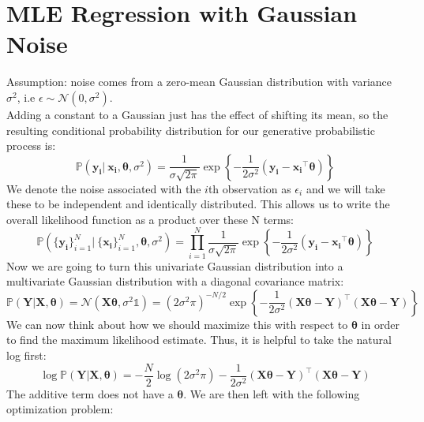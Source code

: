 \documentclass[twoside]{article}
\begin{document}
\section{MLE Regression with Gaussian Noise}
Assumption: noise comes from a zero-mean Gaussian distribution with variance $\sigma^2$, i.e $\epsilon \sim \mathcal{N}(0, \sigma^2)$.\\
Adding a constant to a Gaussian just has the effect of shifting its mean, so the resulting conditional
probability distribution for our generative probabilistic process is:
\begin{equation*}
    \mathbb{P}(\boldsymbol{y_i} | \: \boldsymbol{x_i}, \boldsymbol{\theta}, \sigma^2) = \frac{1}{\sigma\sqrt{2\pi}}\exp{\left \{-\frac{1}{2\sigma^2}(\boldsymbol{y_i} - \boldsymbol{x_i}^{\intercal}\boldsymbol{\theta})\right\}}
\end{equation*}
We denote the noise associated with the $i$th observation as $\epsilon_i$ and we will take these to be independent and identically distributed. This allows us to write the overall likelihood function as a product over these N terms:
\begin{equation*}
    \mathbb{P}(\{\boldsymbol{y_i}\}_{i = 1}^N | \: \{\boldsymbol{x_i}\}_{i = 1}^N, \boldsymbol{\theta}, \sigma^2) = \prod\limits_{i = 1}^N\frac{1}{\sigma\sqrt{2\pi}}\exp{\left \{-\frac{1}{2\sigma^2}(\boldsymbol{y_i} - \boldsymbol{x_i}^{\intercal}\boldsymbol{\theta})\right\}}
\end{equation*}
Now we are going to turn this univariate Gaussian distribution into a multivariate Gaussian distribution with a diagonal covariance matrix:
\begin{equation*}
    \mathbb{P}(\boldsymbol{Y}|\boldsymbol{X},\boldsymbol{\theta}) = \mathcal{N}(\boldsymbol{X}\boldsymbol{\theta}, \sigma^2\mathds{1}) = (2\sigma^2\pi)^{-N / 2}\exp{\left\{ -\frac{1}{2\sigma^2}(\boldsymbol{X\theta} - \boldsymbol{Y})^{\intercal}(\boldsymbol{X\theta} - \boldsymbol{Y}) \right\}}
\end{equation*}
We can now think about how we should maximize this with respect to $\boldsymbol{\theta}$ in order to find the maximum
likelihood estimate. Thus, it is helpful to take the natural log first:
\begin{equation*}
    \log\mathbb{P}(\boldsymbol{Y}|\boldsymbol{X},\boldsymbol{\theta}) = -\frac{N}{2}\log(2\sigma^2\pi) -\frac{1}{2\sigma^2}(\boldsymbol{X\theta} - \boldsymbol{Y})^{\intercal}(\boldsymbol{X\theta} - \boldsymbol{Y})
\end{equation*}
The additive term does not have a $\boldsymbol{\theta}$. We are then left with the following optimization problem:
\end{document}

